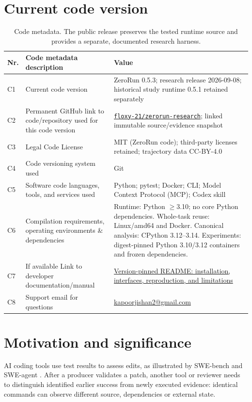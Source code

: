 \documentclass[preprint,12pt,a4paper]{elsarticle}
\begin{document}
\section*{Current code version}
\begin{table}[!ht]
\small
\begin{tabular}{|l|>{\raggedright\arraybackslash}p{5.8cm}|>{\raggedright\arraybackslash}p{5.8cm}|}
\hline
\textbf{Nr.} & \textbf{Code metadata description} & \textbf{Value} \\
\hline
C1 & Current code version & ZeroRun 0.5.3; research release 2026-09-08; historical study runtime 0.5.1 retained separately \\
\hline
C2 & Permanent GitHub link to code/repository used for this code version & \href{https://github.com/floxy-21/zerorun-research/tree/6a2aab778a290102dbe4c8652eefb3310d15d1e0}{\texttt{floxy-21/zerorun-research}}; linked immutable source/evidence snapshot \\
\hline
C3 & Legal Code License & MIT (ZeroRun code); third-party licenses retained; trajectory data CC-BY-4.0 \\
\hline
C4 & Code versioning system used & Git \\
\hline
C5 & Software code languages, tools, and services used & Python; pytest; Docker; CLI; Model Context Protocol (MCP); Codex skill \\
\hline
C6 & Compilation requirements, operating environments \& dependencies & Runtime: Python $\geq$3.10; no core Python dependencies. Whole-task reuse: Linux/amd64 and Docker. Canonical analysis: CPython 3.12--3.14. Experiments: digest-pinned Python 3.10/3.12 containers and frozen dependencies. \\
\hline
C7 & If available Link to developer documentation/manual & \href{https://github.com/floxy-21/zerorun-research/blob/6a2aab778a290102dbe4c8652eefb3310d15d1e0/README.md}{Version-pinned README: installation, interfaces, reproduction, and limitations} \\
\hline
C8 & Support email for questions & \href{mailto:kapoorjishan2@gmail.com}{kapoorjishan2@gmail.com} \\
\hline
\end{tabular}
\caption{Code metadata. The public release preserves the tested runtime source and provides a separate, documented research harness.}
\end{table}
\clearpage

\section{Motivation and significance}
AI coding tools use test results to assess edits, as illustrated by SWE-bench and SWE-agent \cite{jimenez2024swebench,yang2024sweagent}. After a producer validates a patch, another tool or reviewer needs to distinguish identified earlier success from newly executed evidence: identical commands can observe different source, dependencies or external state.
\end{document}
